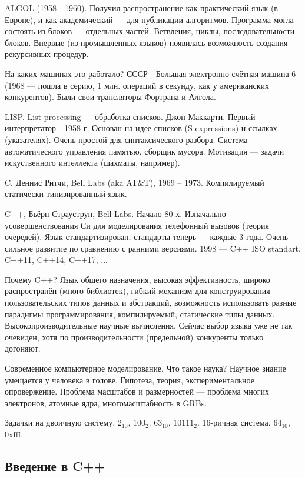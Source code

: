 \documentclass{book}
\begin{document}
ALGOL (1958 - 1960). Получил распространение как практический язык (в Европе), и как академический
--- для публикации алгоритмов. Программа могла состоять из блоков --- отдельных частей. Ветвления,
циклы, последовательности блоков. Впервые (из промышленных языков) появилась возможность создания
рекурсивных процедур.

На каких машинах это работало? СССР - Большая электронно-счётная машина 6 (1968 --- пошла в серию,
1 млн. операций в секунду, как у американских конкурентов). Были свои трансляторы Фортрана и
Алгола.

LISP. List processing --- обработка списков. Джон Маккарти. Первый интерпретатор - 1958 г. Основан
на идее списков (S-expressions) и ссылках (указателях). Очень простой для синтаксического разбора.
Система автоматического управления памятью, сборщик мусора. Мотивация --- задачи искуственного
интеллекта (шахматы, например).

C. Деннис Ритчи, Bell Labs (aka AT\&T), 1969 -- 1973. Компилируемый статически типизированный язык.

C++, Бьёрн Страуструп, Bell Labs. Начало 80-х. Изначально --- усовершенствования Си для
моделирования телефонный вызовов (теория очередей). Язык стандартизирован, стандарты теперь ---
каждые 3 года. Очень сильное развитие по сравнению с ранними версиями.
1998 — C++ ISO standart. C++11, C++14, C++17, ...

Почему C++? Язык общего назначения, высокая эффективность, широко распространён (много
библиотек), гибкий механизм для конструирования пользовательских типов данных и абстракций,
возможность использовать разные парадигмы программирования, компилируемый, статические типы
данных.
Высокопроизводительные научные вычисления. Сейчас выбор языка уже не так очевиден, хотя
по производительности (предельной) конкуренты только догоняют.

Современное компьютерное моделирование. Что такое наука? Научное знание умещается у человека в
голове. Гипотеза, теория, экспериментальное опровержение. Проблема масштабов и размерностей ---
проблема многих электронов, атомные ядра, многомасштабность в GRBs.

    Задачки на двоичную систему. $2_{10}$, $100_2$. $63_{10}$, $10111_2$. 16-ричная система.
    $64_{10}$, $\mathrm{0xfff}$.

\subsection{Введение в C++}
\end{document}
